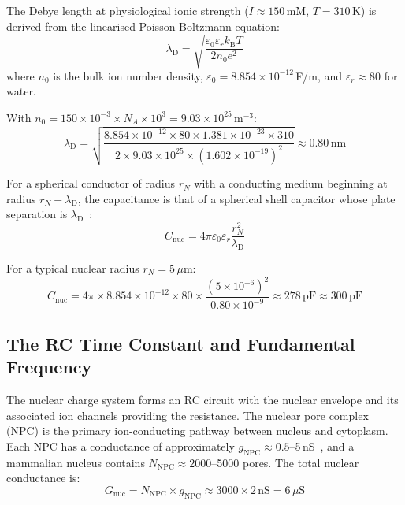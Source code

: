 \documentclass[12pt,a4paper]{article}
\theoremstyle{definition}
\theoremstyle{remark}
\newcommand{\kB}{k_{\mathrm{B}}}
\newcommand{\lD}{\lambda_{\mathrm{D}}}
\newcommand{\eps}{\varepsilon}
\newcommand{\epsz}{\varepsilon_{0}}
\begin{document}
The Debye length at physiological ionic strength ($I \approx 150$\,mM, $T = 310$\,K) is derived from the linearised Poisson-Boltzmann equation:
\begin{equation}
  \lD = \sqrt{\frac{\epsz \eps_r \kB T}{2 n_0 e^2}}
  \label{eq:debye_length}
\end{equation}
where $n_0$ is the bulk ion number density, $\epsz = 8.854 \times 10^{-12}$\,F/m, and $\eps_r \approx 80$ for water.

With $n_0 = 150 \times 10^{-3} \times N_A \times 10^3 = 9.03 \times 10^{25}$\,m$^{-3}$:
\begin{equation}
  \lD = \sqrt{\frac{8.854 \times 10^{-12} \times 80 \times 1.381 \times 10^{-23} \times 310}{2 \times 9.03 \times 10^{25} \times (1.602 \times 10^{-19})^2}} \approx 0.80\,\mathrm{nm}
  \label{eq:debye_numerical}
\end{equation}

For a spherical conductor of radius $r_N$ with a conducting medium beginning at radius $r_N + \lD$, the capacitance is that of a spherical shell capacitor whose plate separation is $\lD$~\cite{Griffiths1999}:
\begin{equation}
  C_{\mathrm{nuc}} = 4\pi \epsz \eps_r \frac{r_N^2}{\lD}
  \label{eq:nuclear_capacitance}
\end{equation}

For a typical nuclear radius $r_N = 5\,\mu$m:
\begin{equation}
  C_{\mathrm{nuc}} = 4\pi \times 8.854 \times 10^{-12} \times 80 \times \frac{(5 \times 10^{-6})^2}{0.80 \times 10^{-9}} \approx 278\,\mathrm{pF} \approx 300\,\mathrm{pF}
  \label{eq:nuclear_cap_numerical}
\end{equation}

\subsection{The RC Time Constant and Fundamental Frequency}

The nuclear charge system forms an RC circuit with the nuclear envelope and its associated ion channels providing the resistance. The nuclear pore complex (NPC) is the primary ion-conducting pathway between nucleus and cytoplasm. Each NPC has a conductance of approximately $g_{\mathrm{NPC}} \approx 0.5$--5\,nS~\cite{Bustamante2000,Shahin2001}, and a mammalian nucleus contains $N_{\mathrm{NPC}} \approx 2000$--5000 pores. The total nuclear conductance is:
\begin{equation}
  G_{\mathrm{nuc}} = N_{\mathrm{NPC}} \times g_{\mathrm{NPC}} \approx 3000 \times 2\,\mathrm{nS} = 6\,\mu\mathrm{S}
\end{equation}
\end{document}
